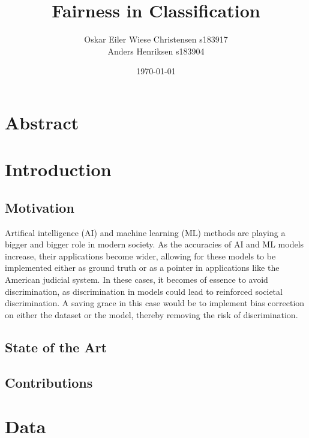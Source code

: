 \documentclass[11pt, fleqn, titlepage]{article}
\title{Fairness in Classification}
\author{Oskar Eiler Wiese Christensen s183917 \\ Anders Henriksen s183904}
\date{\today}
\begin{document}
	
	\maketitle
	\tableofcontents \newpage
	\section{Abstract}
	
	
	\section{Introduction}
	
	\subsection{Motivation}
	Artifical intelligence (AI) and machine learning (ML) methods are playing a bigger and bigger role in modern society. As the accuracies of AI and ML models increase, their applications become wider, allowing for these  models to be implemented either as ground truth or as a pointer in applications like the American judicial system. In these cases, it becomes of essence to avoid discrimination, as discrimination in models could lead to reinforced societal discrimination. A saving grace in this case would be to implement bias correction on either the dataset or the model, thereby removing the risk of discrimination.
	
	\subsection{State of the Art}
	
	
	\subsection{Contributions}
	
	
	\section{Data}
	
\end{document}
